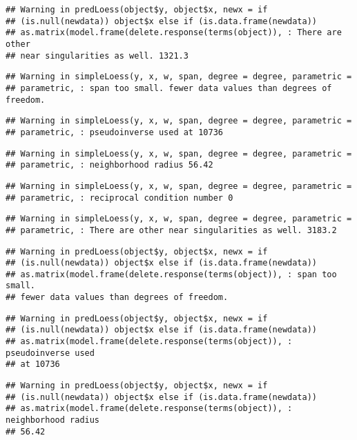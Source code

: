 \documentclass[]{article}
\begin{document}
\begin{verbatim}
## Warning in predLoess(object$y, object$x, newx = if
## (is.null(newdata)) object$x else if (is.data.frame(newdata))
## as.matrix(model.frame(delete.response(terms(object)), : There are other
## near singularities as well. 1321.3
\end{verbatim}

\begin{verbatim}
## Warning in simpleLoess(y, x, w, span, degree = degree, parametric =
## parametric, : span too small. fewer data values than degrees of freedom.
\end{verbatim}

\begin{verbatim}
## Warning in simpleLoess(y, x, w, span, degree = degree, parametric =
## parametric, : pseudoinverse used at 10736
\end{verbatim}

\begin{verbatim}
## Warning in simpleLoess(y, x, w, span, degree = degree, parametric =
## parametric, : neighborhood radius 56.42
\end{verbatim}

\begin{verbatim}
## Warning in simpleLoess(y, x, w, span, degree = degree, parametric =
## parametric, : reciprocal condition number 0
\end{verbatim}

\begin{verbatim}
## Warning in simpleLoess(y, x, w, span, degree = degree, parametric =
## parametric, : There are other near singularities as well. 3183.2
\end{verbatim}

\begin{verbatim}
## Warning in predLoess(object$y, object$x, newx = if
## (is.null(newdata)) object$x else if (is.data.frame(newdata))
## as.matrix(model.frame(delete.response(terms(object)), : span too small.
## fewer data values than degrees of freedom.
\end{verbatim}

\begin{verbatim}
## Warning in predLoess(object$y, object$x, newx = if
## (is.null(newdata)) object$x else if (is.data.frame(newdata))
## as.matrix(model.frame(delete.response(terms(object)), : pseudoinverse used
## at 10736
\end{verbatim}

\begin{verbatim}
## Warning in predLoess(object$y, object$x, newx = if
## (is.null(newdata)) object$x else if (is.data.frame(newdata))
## as.matrix(model.frame(delete.response(terms(object)), : neighborhood radius
## 56.42
\end{verbatim}
\end{document}
